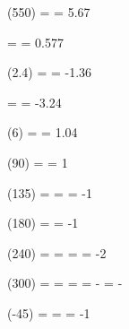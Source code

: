\documentclass{../../main}
\begin{document}
	\begin{arr}[d]
		\cot(550\deg) = \inverse{\tan{550\deg}} = 5.67 
	\end{arr}

	\begin{arr}[e]
		\cot {}\pi =  = 0.577 
	\end{arr}

	\begin{arr}[f]
		\sec(2.4\rad) = \inverse{\cos(2.4\rad)} = -1.36 
	\end{arr}

	\begin{arr}[g]
		\csc {}\pi =  = -3.24 
	\end{arr}

	\begin{arr}[h]
		\sec(6\rad) = \inverse{\cos(6\rad)} = 1.04 
	\end{arr}

	
	
	\begin{arr}[a]
		\csc(90\deg) = \inverse{\sin(90\deg)} = 1
	\end{arr}

	\begin{arr}[b]
		\cot(135\deg) = \inverse{\tan(135\deg)} = \inverse{-\tan(45\deg)} = -1
	\end{arr}

	\begin{arr}[c]
		\sec(180\deg) = \inverse{\cos{180\deg}} = -1
	\end{arr}

	\begin{arr}[d]
		\sec(240\deg) = \inverse{\cos(240\deg)} = \inverse{-\cos(60\deg)} =  = -2
	\end{arr}

	\begin{arr}[e]
		\csc(300\deg) = \inverse{\sin(300\deg)} = \inverse{-\sin(60\deg)} =  = - = -
	\end{arr}

	\begin{arr}[f]
		\cot(-45\deg) = \inverse{\tan(-45\deg)} = \inverse{-\tan(45\deg)} = -1
	\end{arr}
\end{document}
